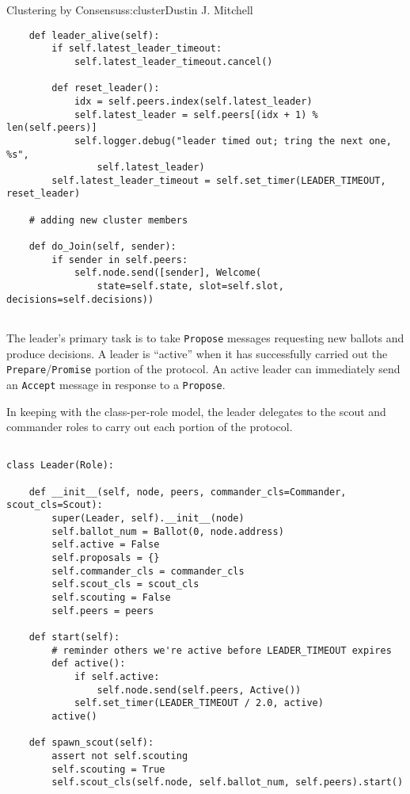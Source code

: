 \begin{aosachapter}{Clustering by Consensus}{s:cluster}{Dustin J. Mitchell}
\begin{verbatim}
    def leader_alive(self):
        if self.latest_leader_timeout:
            self.latest_leader_timeout.cancel()

        def reset_leader():
            idx = self.peers.index(self.latest_leader)
            self.latest_leader = self.peers[(idx + 1) % len(self.peers)]
            self.logger.debug("leader timed out; tring the next one, %s", 
                self.latest_leader)
        self.latest_leader_timeout = self.set_timer(LEADER_TIMEOUT, reset_leader)

    # adding new cluster members

    def do_Join(self, sender):
        if sender in self.peers:
            self.node.send([sender], Welcome(
                state=self.state, slot=self.slot, decisions=self.decisions))
    
\end{verbatim}

\label{leader-scout-and-commander}

The leader's primary task is to take \texttt{Propose} messages
requesting new ballots and produce decisions. A leader is ``active''
when it has successfully carried out the
\texttt{Prepare}/\texttt{Promise} portion of the protocol. An active
leader can immediately send an \texttt{Accept} message in response to a
\texttt{Propose}.

In keeping with the class-per-role model, the leader delegates to the
scout and commander roles to carry out each portion of the protocol.

\begin{verbatim}

class Leader(Role):

    def __init__(self, node, peers, commander_cls=Commander, scout_cls=Scout):
        super(Leader, self).__init__(node)
        self.ballot_num = Ballot(0, node.address)
        self.active = False
        self.proposals = {}
        self.commander_cls = commander_cls
        self.scout_cls = scout_cls
        self.scouting = False
        self.peers = peers

    def start(self):
        # reminder others we're active before LEADER_TIMEOUT expires
        def active():
            if self.active:
                self.node.send(self.peers, Active())
            self.set_timer(LEADER_TIMEOUT / 2.0, active)
        active()

    def spawn_scout(self):
        assert not self.scouting
        self.scouting = True
        self.scout_cls(self.node, self.ballot_num, self.peers).start()


\end{verbatim}
\end{aosachapter}
